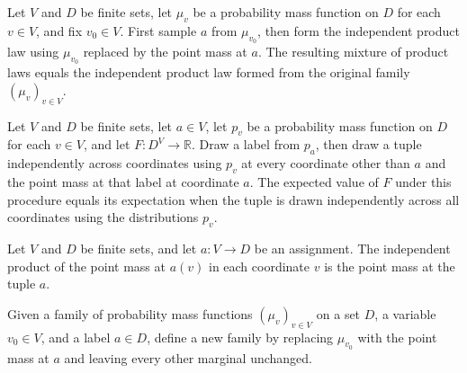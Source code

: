 \begin{theorem}
\label{FABL.bind_replace_independentProductPMF}
\leanok
{}
Let $V$ and $D$ be finite sets, let $\mu_v$ be a probability mass function on $D$ for
each $v\in V$, and fix $v_0\in V$. First sample $a$ from $\mu_{v_0}$, then form the
independent product law using $\mu_{v_0}$ replaced by the point mass at $a$. The
resulting mixture of product laws equals the independent product law formed from the
original family $(\mu_v)_{v\in V}$.
\end{theorem}

\begin{theorem}
\label{FABL.pmfExpectation_replace_independentProductPMF}
\leanok
{}
Let $V$ and $D$ be finite sets, let $a\in V$, let $p_v$ be a probability mass function
on $D$ for each $v\in V$, and let $F:D^V\to\mathbb{R}$. Draw a label from $p_a$, then
draw a tuple independently across coordinates using $p_v$ at every coordinate other than
$a$ and the point mass at that label at coordinate $a$. The expected value of $F$ under
this procedure equals its expectation when the tuple is drawn independently across all
coordinates using the distributions $p_v$.
\end{theorem}

\begin{theorem}
\label{FABL.independentProductPMF_pure}
\leanok
{}
Let $V$ and $D$ be finite sets, and let $a:V\to D$ be an assignment. The independent
product of the point mass at $a(v)$ in each coordinate $v$ is the point mass at the
tuple $a$.
\end{theorem}

\begin{definition}
\label{FABL.replaceMarginal}
\leanok
Given a family of probability mass functions $(\mu_v)_{v\in V}$ on a set $D$, a variable
$v_0\in V$, and a label $a\in D$, define a new family by replacing $\mu_{v_0}$ with the
point mass at $a$ and leaving every other marginal unchanged.
\end{definition}

